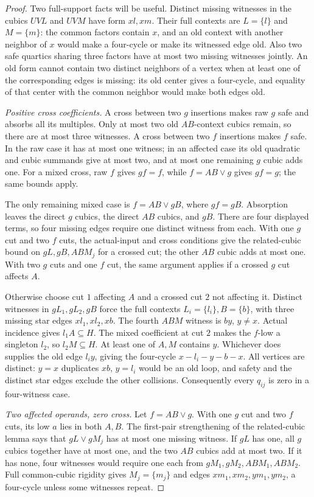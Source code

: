 \documentclass[11pt]{article}
\theoremstyle{definition}
\theoremstyle{remark}
\begin{document}
\begin{proof}
Two full-support facts will be useful. Distinct missing witnesses in the cubics $UVL$ and $UVM$ have form $xl,xm$. Their full contexts are $L=\{l\}$ and $M=\{m\}$: the common factors contain $x$, and an old context with another neighbor of $x$ would make a four-cycle or make its witnessed edge old. Also two safe quartics sharing three factors have at most two missing witnesses jointly. An old form cannot contain two distinct neighbors of a vertex when at least one of the corresponding edges is missing: its old center gives a four-cycle, and equality of that center with the common neighbor would make both edges old.

\emph{Positive cross coefficients.} A cross between two $g$ insertions makes raw $g$ safe and absorbs all its multiples. Only at most two old $AB$-context cubics remain, so there are at most three witnesses. A cross between two $f$ insertions makes $f$ safe. In the raw case it has at most one witness; in an affected case its old quadratic and cubic summands give at most two, and at most one remaining $g$ cubic adds one. For a mixed cross, raw $f$ gives $gf=f$, while $f=AB\vee g$ gives $gf=g$; the same bounds apply.

The only remaining mixed case is $f=AB\vee gB$, where $gf=gB$. Absorption leaves the direct $g$ cubics, the direct $AB$ cubics, and $gB$. There are four displayed terms, so four missing edges require one distinct witness from each. With one $g$ cut and two $f$ cuts, the actual-input and cross conditions give the related-cubic bound on $gL,gB,ABM_j$ for a crossed cut; the other $AB$ cubic adds at most one. With two $g$ cuts and one $f$ cut, the same argument applies if a crossed $g$ cut affects $A$.

Otherwise choose cut $1$ affecting $A$ and a crossed cut $2$ not affecting it. Distinct witnesses in $gL_1,gL_2,gB$ force the full contexts $L_i=\{l_i\},B=\{b\}$, with three missing star edges $xl_1,xl_2,xb$. The fourth $ABM$ witness is $by$, $y\ne x$. Actual incidence gives $l_1A\subseteq H$. The mixed coefficient at cut $2$ makes the $f$-low a singleton $l_2$, so $l_2M\subseteq H$. At least one of $A,M$ contains $y$. Whichever does supplies the old edge $l_i y$, giving the four-cycle $x-l_i-y-b-x$. All vertices are distinct: $y=x$ duplicates $xb$, $y=l_i$ would be an old loop, and safety and the distinct star edges exclude the other collisions. Consequently every $q_{ij}$ is zero in a four-witness case.

\emph{Two affected operands, zero cross.} Let $f=AB\vee g$. With one $g$ cut and two $f$ cuts, its low $a$ lies in both $A,B$. The first-pair strengthening of the related-cubic lemma says that $gL\vee gM_j$ has at most one missing witness. If $gL$ has one, all $g$ cubics together have at most one, and the two $AB$ cubics add at most two. If it has none, four witnesses would require one each from $gM_1,gM_2,ABM_1,ABM_2$. Full common-cubic rigidity gives $M_j=\{m_j\}$ and edges $xm_1,xm_2,ym_1,ym_2$, a four-cycle unless some witnesses repeat.


\end{proof}
\end{document}
